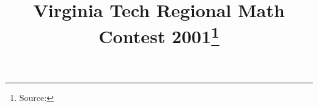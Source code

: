 \documentclass[10pt]{article}
\begin{document}
\title{Virginia Tech Regional Math Contest 2001\footnote{Source: \source}}
\author{\vspace{-2ex}}
\date{\vspace{-6ex}} %
\maketitle







\end{document}

